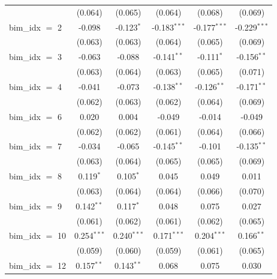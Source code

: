 \begin{tabular}{lccccc}
                       & (0.064)        & (0.065)        & (0.064)        & (0.068)        & (0.069)\\   
   bim\_idx $=$ 2      & -0.098         & -0.123$^{*}$   & -0.183$^{***}$ & -0.177$^{***}$ & -0.229$^{***}$\\   
                       & (0.063)        & (0.063)        & (0.064)        & (0.065)        & (0.069)\\   
   bim\_idx $=$ 3      & -0.063         & -0.088         & -0.141$^{**}$  & -0.111$^{*}$   & -0.156$^{**}$\\   
                       & (0.063)        & (0.064)        & (0.063)        & (0.065)        & (0.071)\\   
   bim\_idx $=$ 4      & -0.041         & -0.073         & -0.138$^{**}$  & -0.126$^{**}$  & -0.171$^{**}$\\   
                       & (0.062)        & (0.063)        & (0.062)        & (0.064)        & (0.069)\\   
   bim\_idx $=$ 6      & 0.020          & 0.004          & -0.049         & -0.014         & -0.049\\   
                       & (0.062)        & (0.062)        & (0.061)        & (0.064)        & (0.066)\\   
   bim\_idx $=$ 7      & -0.034         & -0.065         & -0.145$^{**}$  & -0.101         & -0.135$^{**}$\\   
                       & (0.063)        & (0.064)        & (0.065)        & (0.065)        & (0.069)\\   
   bim\_idx $=$ 8      & 0.119$^{*}$    & 0.105$^{*}$    & 0.045          & 0.049          & 0.011\\   
                       & (0.063)        & (0.064)        & (0.064)        & (0.066)        & (0.070)\\   
   bim\_idx $=$ 9      & 0.142$^{**}$   & 0.117$^{*}$    & 0.048          & 0.075          & 0.027\\   
                       & (0.061)        & (0.062)        & (0.061)        & (0.062)        & (0.065)\\   
   bim\_idx $=$ 10     & 0.254$^{***}$  & 0.240$^{***}$  & 0.171$^{***}$  & 0.204$^{***}$  & 0.166$^{**}$\\   
                       & (0.059)        & (0.060)        & (0.059)        & (0.061)        & (0.065)\\   
   bim\_idx $=$ 12     & 0.157$^{**}$   & 0.143$^{**}$   & 0.068          & 0.075          & 0.030\\   

\end{tabular}
